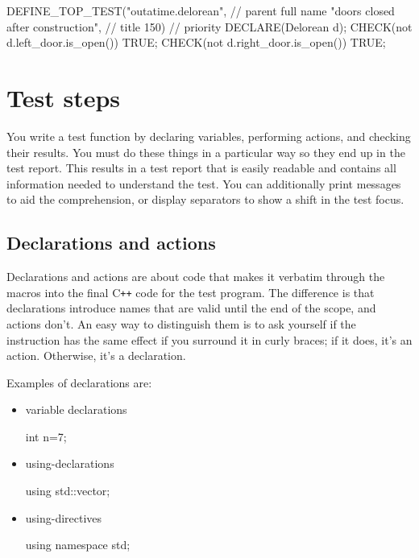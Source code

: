 \documentclass[twoside, a4paper, article]{memoir}
\newcommand*\Cpp{C\texttt{++}}
\begin{document}
\begin{cpplisting}
DEFINE_TOP_TEST("outatime.delorean", // parent full name
                "doors closed after construction", // title
                150) // priority
{
  DECLARE(Delorean d);
  CHECK(not d.left_door.is_open()) TRUE;
  CHECK(not d.right_door.is_open()) TRUE;
}
\end{cpplisting}


\chapter{Test steps}
\label{cha:test-steps}

You write a test function by declaring variables, performing actions, and
checking their results.  You must do these things in a particular way so they
end up in the test report.  This results in a test report that is easily
readable and contains all information needed to understand the test.  You can
additionally print messages to aid the comprehension, or display separators to
show a shift in the test focus.

\section{Declarations and actions}
\label{sec:declarations-actions}

Declarations and actions are about code that makes it verbatim through the
macros into the final \Cpp{} code for the test program.  The difference is that
declarations introduce names that are valid until the end of the scope, and
actions don't.  An easy way to distinguish them is to ask yourself if the
instruction has the same effect if you surround it in curly braces; if it does,
it's an action. Otherwise, it's a declaration.

Examples of declarations are:
\begin{itemize}
\item variable declarations
\begin{cpplisting}
int n=7;
\end{cpplisting}

\item using-declarations
\begin{cpplisting}
using std::vector;
\end{cpplisting}

\item using-directives
\begin{cpplisting}
using namespace std;
\end{cpplisting}
\end{itemize}
\end{document}
